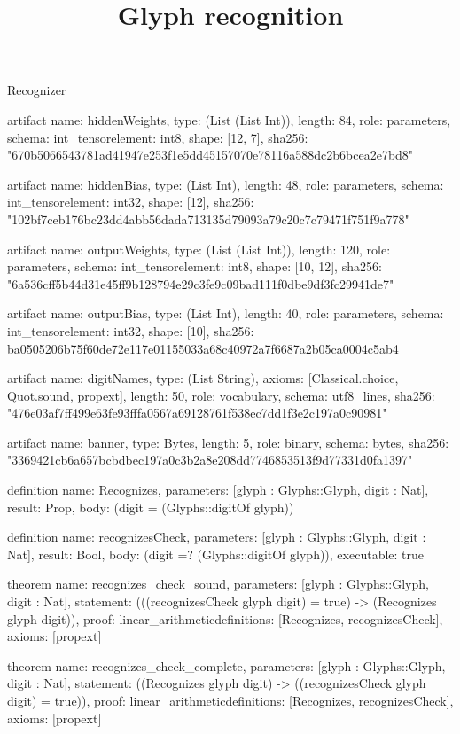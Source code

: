 \begin{lexlean}{Recognizer}
\title{Glyph recognition}
\begin{semanticmodule}
artifact{
  name: hiddenWeights,
  type: (List (List Int)),
  length: 84,
  role: parameters,
  schema: int_tensor{element: int8, shape: [12, 7]},
  sha256: "670b5066543781ad41947e253f1e5dd45157070e78116a588dc2b6bcea2e7bd8"
}

artifact{
  name: hiddenBias,
  type: (List Int),
  length: 48,
  role: parameters,
  schema: int_tensor{element: int32, shape: [12]},
  sha256: "102bf7ceb176bc23dd4abb56dada713135d79093a79c20c7c79471f751f9a778"
}

artifact{
  name: outputWeights,
  type: (List (List Int)),
  length: 120,
  role: parameters,
  schema: int_tensor{element: int8, shape: [10, 12]},
  sha256: "6a536cff5b44d31e45ff9b128794e29c3fe9c09bad111f0dbe9df3fc29941de7"
}

artifact{
  name: outputBias,
  type: (List Int),
  length: 40,
  role: parameters,
  schema: int_tensor{element: int32, shape: [10]},
  sha256: ba0505206b75f60de72e117e01155033a68c40972a7f6687a2b05ca0004c5ab4
}

artifact{
  name: digitNames,
  type: (List String),
  axioms: [Classical.choice, Quot.sound, propext],
  length: 50,
  role: vocabulary,
  schema: utf8_lines{},
  sha256: "476e03af7ff499e63fe93fffa0567a69128761f538ec7dd1f3e2c197a0c90981"
}

artifact{
  name: banner,
  type: Bytes,
  length: 5,
  role: binary,
  schema: bytes{},
  sha256: "3369421cb6a657bcbdbec197a0c3b2a8e208dd7746853513f9d77331d0fa1397"
}

definition{
  name: Recognizes,
  parameters: [glyph : Glyphs::Glyph, digit : Nat],
  result: Prop,
  body: (digit = (Glyphs::digitOf glyph))
}

definition{
  name: recognizesCheck,
  parameters: [glyph : Glyphs::Glyph, digit : Nat],
  result: Bool,
  body: (digit =? (Glyphs::digitOf glyph)),
  executable: true
}

theorem{
  name: recognizes_check_sound,
  parameters: [glyph : Glyphs::Glyph, digit : Nat],
  statement: (((recognizesCheck glyph digit) = true) -> (Recognizes glyph digit)),
  proof: linear_arithmetic{definitions: [Recognizes, recognizesCheck]},
  axioms: [propext]
}

theorem{
  name: recognizes_check_complete,
  parameters: [glyph : Glyphs::Glyph, digit : Nat],
  statement: ((Recognizes glyph digit) -> ((recognizesCheck glyph digit) = true)),
  proof: linear_arithmetic{definitions: [Recognizes, recognizesCheck]},
  axioms: [propext]
}


\end{semanticmodule}
\end{lexlean}
